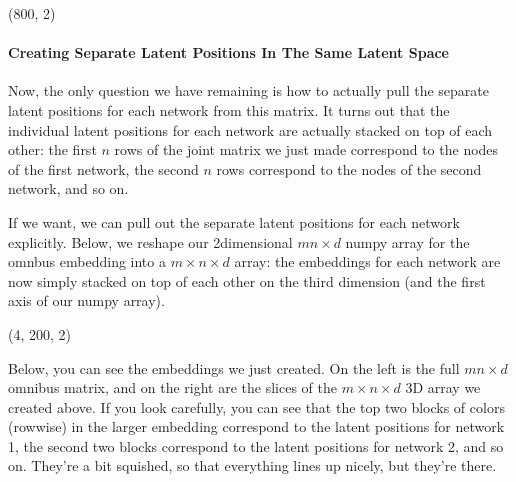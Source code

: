 \documentclass[letterpaper,10pt,english]{jupyterBook}
\begin{document}
\begin{sphinxVerbatim}[commandchars=\\\{\}]
(800, 2)
\end{sphinxVerbatim}


\paragraph{Creating Separate Latent Positions In The Same Latent Space}
\label{\detokenize{representations/ch6/multigraph-representation-learning:creating-separate-latent-positions-in-the-same-latent-space}}
\sphinxAtStartPar
Now, the only question we have remaining is how to actually pull the separate latent positions for each network from this matrix. It turns out that the individual latent positions for each network are actually stacked on top of each other: the first \(n\) rows of the joint matrix we just made correspond to the nodes of the first network, the second \(n\) rows correspond to the nodes of the second network, and so on.

\sphinxAtStartPar
If we want, we can pull out the separate latent positions for each network explicitly. Below, we reshape our 2\sphinxhyphen{}dimensional \(mn \times d\) numpy array for the omnbus embedding into a \(m \times n \times d\) array: the embeddings for each network are now simply stacked on top of each other on the third dimension (and the first axis of our numpy array).

\begin{sphinxVerbatim}[commandchars=\\\{\}]
  
  \PYG{p}{[}\PYG{p}{]}
    

\end{sphinxVerbatim}

\begin{sphinxVerbatim}[commandchars=\\\{\}]
(4, 200, 2)
\end{sphinxVerbatim}

\sphinxAtStartPar
Below, you can see the embeddings we just created. On the left is the full \(mn \times d\) omnibus matrix, and on the right are the slices of the \(m \times n \times d\) 3\sphinxhyphen{}D array we created above. If you look carefully, you can see that the top two blocks of colors (row\sphinxhyphen{}wise) in the larger embedding correspond to the latent positions for network 1, the second two blocks correspond to the latent positions for network 2, and so on. They’re a bit squished, so that everything lines up nicely, but they’re there.
\end{document}
